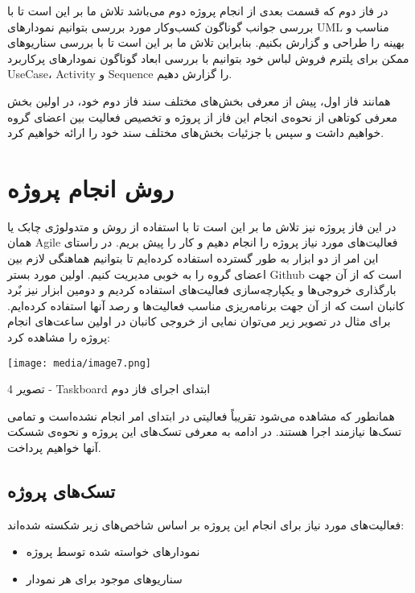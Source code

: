 \documentclass[]{article}
\begin{document}
در فاز دوم که قسمت بعدی از انجام پروژه دوم می‌باشد تلاش ما بر این است تا
با بررسی جوانب گوناگون کسب‌وکار مورد بررسی بتوانیم نمودارهای UML مناسب و
بهینه را طراحی و گزارش بکنیم. بنابراین تلاش ما بر این است تا با بررسی
سناریو‌های ممکن برای پلترم فروش لباس خود بتوانیم با بررسی ابعاد گوناگون
نمودارهای پرکاربرد UseCase، Activity و Sequence را گزارش دهیم.

همانند فاز اول، پیش از معرفی بخش‌های مختلف سند فاز دوم خود، در اولین بخش
معرفی کوتاهی از نحوه‌ی انجام این فاز از پروژه و تخصیص فعالیت بین اعضای
گروه خواهیم داشت و سپس با جزئیات بخش‌های مختلف سند خود را ارائه خواهیم
کرد.

\section{روش انجام
پروژه}\label{ux631ux648ux634-ux627ux646ux62cux627ux645-ux67eux631ux648ux698ux647-1}

در این فاز پروژه نیز تلاش ما بر این است تا با استفاده از روش و متدولوژی
چابک یا همان Agile فعالیت‌های مورد نیاز پروژه را انجام دهیم و کار را پیش
بریم. در راستای این امر از دو ابزار به طور گسترده استفاده کرده‌ایم تا
بتوانیم هماهنگی لازم بین اعضای گروه را به خوبی مدیریت کنیم. اولین مورد
بستر Github است که از آن جهت بارگذاری خروجی‌ها و یکپارچه‌سازی فعالیت‌های
استفاده کردیم و دومین ابزار نیز بٌرد کانبان است که از آن جهت برنامه‌ریزی
مناسب فعالیت‌ها و رصد آنها استفاده کرده‌ایم. برای مثال در تصویر زیر
می‌توان نمایی از خروجی کانبان در اولین ساعت‌های انجام پروژه را مشاهده
کرد:

\texttt{[image: media/image7.png]}

تصویر 4 - Taskboard ابتدای اجرای فاز دوم

همانطور که مشاهده می‌شود تقریباً فعالیتی در ابتدای امر انجام نشده‌است و
تمامی تسک‌ها نیازمند اجرا هستند. در ادامه به معرفی تسک‌های این پروژه و
نحوه‌ی شسکت‌ آنها خواهیم پرداخت.

\subsection{تسک‌های
پروژه}\label{ux62aux633ux6a9ux647ux627ux6cc-ux67eux631ux648ux698ux647-1}

فعالیت‌های مورد نیاز برای انجام این پروژه بر اساس شاخص‌های زیر شکسته
شده‌اند:

\begin{itemize}
\item
  نمودارهای خواسته شده توسط پروژه
\item
  سناریوهای موجود برای هر نمودار
\end{itemize}
\end{document}
